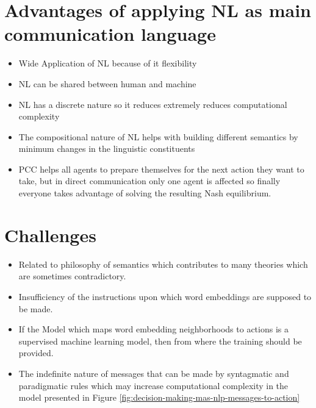 \documentclass{article}
\begin{document}
\begin{multicols}{2}
	\section{Advantages of applying NL as main communication language}
		\begin{itemize}
			\item Wide Application of NL because of it flexibility
			
			\item NL can be shared between human and machine 
			
			\item NL has a discrete nature so it reduces extremely reduces computational complexity 
			
			\item The compositional nature of NL helps with building different semantics by minimum changes in the linguistic constituents 
			
			\item PCC helps all agents to prepare themselves for the next action they want to take, but in direct communication only one agent is affected so finally everyone takes advantage of solving the resulting Nash equilibrium.
		\end{itemize}
	
	\section{Challenges}
		\begin{itemize}
			\item Related to philosophy of semantics which contributes to many theories which are sometimes contradictory.
			
			\item Insufficiency of the instructions upon which word embeddings are supposed to be made. 
			
			\item If the Model which maps word embedding neighborhoods to actions is a supervised machine learning model, then from where the training should be provided.  
			
			\item The indefinite nature of messages that can be made by syntagmatic and paradigmatic rules \citep{saussure-2011-course-in-general-linguistics-translated-by-wade-baskin-edited-by-perry-meisel-and-haun-saussy} which may increase computational complexity in the model presented in Figure \ref{fig:decision-making-mas-nlp-messages-to-action} 
			

\end{itemize}
\end{multicols}
\end{document}
